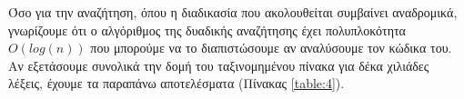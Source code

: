 Όσο για την αναζήτηση, όπου η διαδικασία που ακολουθείται συμβαίνει αναδρομικά, γνωρίζουμε ότι ο αλγόριθμος της δυαδικής αναζήτησης έχει πολυπλοκότητα $O(log(n))$ που μπορούμε να το διαπιστώσουμε αν αναλύσουμε τον κώδικα του. Αν εξετάσουμε συνολικά την δομή του ταξινομημένου πίνακα για δέκα χιλιάδες λέξεις, έχουμε τα παραπάνω αποτελέσματα (Πίνακας \ref{table:4}).